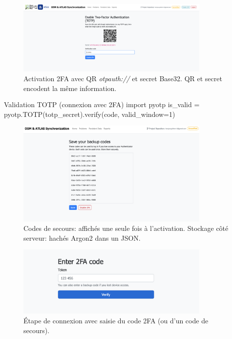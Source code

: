 \begin{itemize}
\begin{figure}[h]
  \centering
  \includegraphics[width=0.85\textwidth]{../figures/chap10/enable_up2fa.png}
  \caption{Activation 2FA avec QR \textit{otpauth://} et secret Base32. QR et secret encodent la même information.}
\end{figure}

\begin{codebox}[language=Python]{Validation TOTP (connexion avec 2FA)}
import pyotp
is_valid = pyotp.TOTP(totp_secret).verify(code, valid_window=1)
\end{codebox}

\begin{figure}[h]
  \centering
  \includegraphics[width=0.85\textwidth]{../figures/chap10/backupcodes.png}
  \caption{Codes de secours: affichés une seule fois à l'activation. Stockage côté serveur: hachés Argon2 dans un JSON.}
\end{figure}

\begin{figure}[h]
  \centering
  \includegraphics[width=0.85\textwidth]{../figures/chap10/enter2FA.png}
  \caption{Étape de connexion avec saisie du code 2FA (ou d'un code de secours).}
\end{figure}


\end{itemize}
